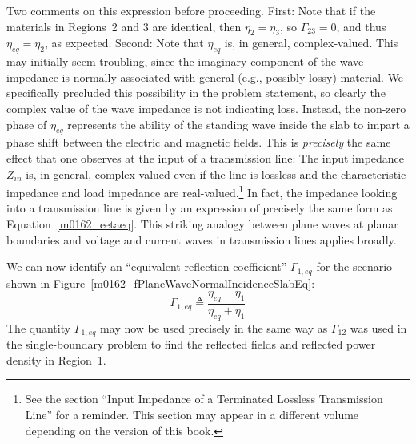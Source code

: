 Two comments on this expression before proceeding.  
First: Note that if the materials in Regions~2 and 3 are identical, then $\eta_2=\eta_3$, so $\Gamma_{23}=0$, and thus $\eta_{eq}=\eta_2$, as expected.  
Second: Note that $\eta_{eq}$ is, in general, complex-valued.  
This may initially seem troubling, since the imaginary component of the wave impedance is normally associated with general (e.g., possibly lossy) material.
We specifically precluded this possibility in the problem statement, so clearly the complex value of the wave impedance is not indicating loss.
Instead, the non-zero phase of $\eta_{eq}$ represents the ability of the standing wave 
inside the slab to impart a phase shift between the electric and magnetic fields.
This is \emph{precisely} the same effect that one observes at the input of a transmission line: 
The input impedance $Z_{in}$ is, in general, complex-valued even if the line is lossless and the characteristic impedance and load impedance are real-valued.\footnote{See the section ``Input Impedance of a Terminated Lossless Transmission Line'' for a reminder.  This section may appear in a different volume depending on the version of this book.}
In fact, the impedance looking into a transmission line is given by an expression of precisely the same form as Equation~\ref{m0162_eetaeq}.
This striking analogy between plane waves at planar boundaries and voltage and current waves in transmission lines applies broadly. 

We can now identify an ``equivalent reflection coefficient'' $\Gamma_{1,eq}$ for the scenario shown in Figure~\ref{m0162_fPlaneWaveNormalIncidenceSlabEq}:
%
\begin{equation}
\boxed{
\Gamma_{1,eq}  \triangleq \frac{\eta_{eq}-\eta_1}{\eta_{eq}+\eta_1} 
}
\end{equation} 
%
The quantity $\Gamma_{1,eq}$ may now be used precisely in the same way as $\Gamma_{12}$ was used in the single-boundary problem to find the reflected fields and reflected power density in Region~1.

